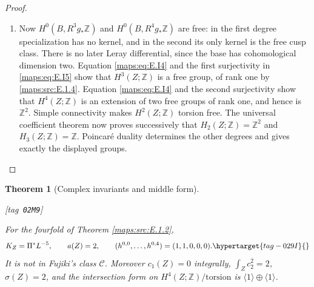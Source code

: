 \documentclass[11pt,a4paper]{article}
\numberwithin{equation}{section}
\newtheorem{theorem}{Theorem}[section]
\theoremstyle{definition}
\newcommand{\StatementRecord}[4]{{\upshape\footnotesize[tag~\texttt{#3}]}\enspace\ignorespaces}
\begin{document}
\begin{proof}
\begin{enumerate}[label=\arabic*.,leftmargin=*]
\item Now \(H^0(B,R^3g_*\mathbb Z)\) and
\(H^0(B,R^4g_*\mathbb Z)\) are free: in the first degree
specialization has no kernel, and in the second its only
kernel is the free cusp class. There is no later Leray
differential, since the base has cohomological dimension two.
Equation \eqref{maps:eq:E.I4} and the first surjectivity in \eqref{maps:eq:E.I5} show that
\(H^3(Z;\mathbb Z)\) is a free group, of rank one by \ref{maps:src:E.1.4}.
Equation \eqref{maps:eq:E.I4} and the second surjectivity show that
\(H^4(Z;\mathbb Z)\) is an extension of two free groups of
rank one, and hence is \(\mathbb Z^2\).
Simple connectivity makes \(H^2(Z;\mathbb Z)\) torsion free.
The universal coefficient theorem now proves successively that
\(H_2(Z;\mathbb Z)=\mathbb Z^2\) and
\(H_3(Z;\mathbb Z)=\mathbb Z\). Poincar\'e duality determines
the other degrees and gives exactly the displayed groups.
\end{enumerate}
\end{proof}


\begin{theorem}[Complex invariants and middle form]\hypertarget{tag-02M9}{}\label{maps:src:E.2.1}
\StatementRecord{maps:src:E.2.1}{proved}{02M9}{\cref{maps:src:E.1.2}, \eqref{maps:eq:E.14}, \eqref{maps:eq:E.13}, \eqref{maps:eq:E.1}, \eqref{maps:eq:E.8}; \cite[Theorem 1.1 and Remark 1.2]{ffJiaMeng}; \cite[(1.2)--(1.4)]{ffEsoleKang}; \cite[Theorem 2.2.1]{ffPetersSterk}}


For the fourfold of Theorem \ref{maps:src:E.1.2},
\begin{equation}
 K_Z=\Pi^*L^{-5},\qquad a(Z)=2,\qquad
 (h^{0,0},\ldots,h^{0,4})=(1,1,0,0,0).
 \hypertarget{tag-029I}{}\label{maps:eq:E.12}
\end{equation}
It is not in Fujiki's class $\mathcal C$.  Moreover
$c_1(Z)=0$ integrally, $\int_Zc_2^2=2$, $\sigma(Z)=2$, and
the intersection form on $H^4(Z;\mathbb Z)/\mathrm{torsion}$ is
$\langle1\rangle\oplus\langle1\rangle$.

\end{theorem}
\end{document}
